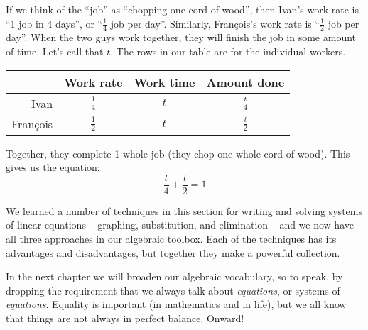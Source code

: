 If we think of the ``job'' as ``chopping one cord of wood'', then Ivan's work rate is ``1 job in 4 days'', or ``$\frac{1}{4}$ job per day''. Similarly, Fran\c{c}ois's work rate is ``$\frac{1}{2}$ job per day''. When the two guys work together, they will finish the job in some amount of time. Let's call that $t$. The rows in our table are for the individual workers.

\begin{center}
\begin{tabular}{r|ccc}
				& Work rate				& Work time			& Amount done\\\hline
Ivan				& $\frac{1}{4}$			& $t$					& $\frac{t}{4}$\\
Fran\c{c}ois		& $\frac{1}{2}$			& $t$					& $\frac{t}{2}$\\
\end{tabular}
\end{center}

Together, they complete 1 whole job (they chop one whole cord of wood). This gives us the equation:
\[
\frac{t}{4} + \frac{t}{2} = 1
\]

\chaptersummary

We learned a number of techniques in this section for writing and solving systems of linear equations -- graphing, substitution, and elimination -- and we now have all three approaches in our algebraic toolbox. Each of the techniques has its advantages and disadvantages, but together they make a powerful collection.

In the next chapter we will broaden our algebraic vocabulary, so to speak, by dropping the requirement that we always talk about \textit{equations}, or systems of \textit{equations}. Equality is important (in mathematics and in life), but we all know that things are not always in perfect balance. Onward!
